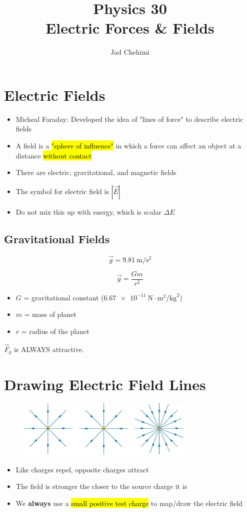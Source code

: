 \documentclass[a4paper,12pt]{article}
\title{Physics 30 \\ Electric Forces \& Fields}
\author{Jad Chehimi}
\begin{document}
\maketitle

\tableofcontents

\pagebreak

\section{Electric Fields}
\begin{itemize}
    \item{Micheal Faraday: Developed the idea of "lines of force" to describe electric fields}
    \item{A field is a \hl{"sphere of influence"} in which a force can affect an object at a distance \hl{without contact}}
    \item{There are electric, gravitational, and magnetic fields}
    \item{The symbol for electric field is $|\vec{E}|$}
    \item{Do not mix this up with energy, which is scalar $\Delta{E}$}
\end{itemize}

\subsection{Gravitational Fields}
\Large $$\vec{g} = \SI{9.81}{\m\per\s\squared}$$ \normalsize

\Large $$\vec{g} = \frac{Gm}{r^2}$$ \normalsize
\begin{itemize}
    \item{$G$ = gravitational constant ($\SI{6.67e-11}{\N\cdot\m\squared\per\kg\squared}$)}
    \item{$m$ = mass of planet}
    \item{$r$ = radius of the planet}
\end{itemize}

$\vec{F}_g$ is ALWAYS attractive.

\pagebreak
\section{Drawing Electric Field Lines}
\begin{figure}[H]
    \centering
    \includegraphics[width=0.75\textwidth]{fieldlines}
\end{figure}
\begin{itemize}
    \item{Like charges repel, opposite charges attract}
    \item{The field is stronger the closer to the source charge it is}
    \item{We \textbf{always} use a \hl{small positive test charge} to map/draw the electric field}
\end{itemize}
\end{document}
